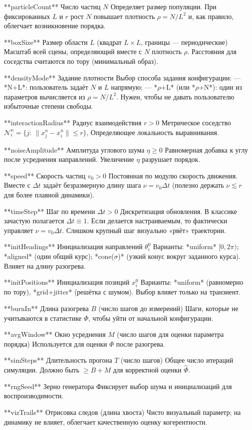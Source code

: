 **particleCount**
Число частиц $N$
Определяет размер популяции. При фиксированных $L$ и $r$ рост $N$ повышает плотность $\rho=N/L^2$ и, как правило, облегчает возникновение порядка.

**boxSize**
Размер области $L$ (квадрат $L\times L$, границы — периодические)
Масштаб всей сцены, определяющий вместе с $N$ плотность $\rho$. Расстояния для соседства считаются по тору (минимальный образ).

**densityMode**
Задание плотности
Выбор способа задания конфигурации:
— *N+L*: пользователь задаёт $N$ и $L$ напрямую;
— *$\rho$+L* (или *$\rho$+N*): один из параметров вычисляется из $\rho=N/L^2$.
Нужен, чтобы не давать пользователю избыточные степени свободы.

**interactionRadius**
Радиус взаимодействия $r>0$
Метрическое соседство $\mathcal N_i^n=\{j:\ \|x_j^n-x_i^n\|\le r\}$, Определяющее локальность выравнивания.

**noiseAmplitude**
Амплитуда углового шума $\eta\ge 0$
Равномерная добавка к углу после усреднения направлений. Увеличение $\eta$ разрушает порядок.

**speed**
Скорость частиц $v_0>0$
Постоянная по модулю скорость движения. Вместе с $\Delta t$ задаёт безразмерную длину шага $\nu=v_0\Delta t$ (полезно держать $\nu\lesssim r$ для более плавной динамики).

**timeStep**
Шаг по времени $\Delta t>0$
Дискретизация обновления. В классике зачастую полагается $\Delta t\equiv 1$. Если делается настраиваемым, то фактически управляет $\nu=v_0\Delta t$. Слишком крупный шаг визуально «рвёт» траектории.

**initHeadings**
Инициализация направлений $\theta_i^0$
Варианты: *uniform* $[0,2\pi)$; *aligned* (один общий курс); *cone($\sigma$)* (узкий конус вокруг заданного курса). Влияет на длину разогрева.

**initPositions**
Инициализация позиций $x_i^0$
Варианты: *uniform* (равномерно по тору), *grid+jitter* (решётка с шумом). Выбор влияет только на транзиент.

**burnIn**
Длина разогрева $B$ (число шагов до измерений)
Шаги, которые не учитываются в статистике $\Phi$, чтобы уйти от начальной конфигурации.

**avgWindow**
Окно усреднения $M$ (число шагов для оценки параметра порядка)
Используется для оценки $\Phi$ после разогрева.

**simSteps**
Длительность прогона $T$ (число шагов)
Общее число итераций симуляции. Должно быть $\ge B+M$ для корректной оценки $\widehat\Phi$.

**rngSeed**
Зерно генератора
Фиксирует выбор шума и инициализаций для воспроизводимости.

**vizTrails**
Отрисовка следов (длина хвоста)
Чисто визуальный параметр; на динамику не влияет, облегчает качественную оценку когерентности.